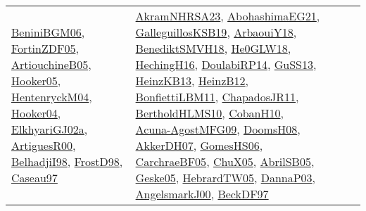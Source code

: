 {\begin{longtable}{lp{3cm}>{\raggedright}p{6cm}>{\raggedright}p{6cm}p{8cm}}
\href{papers/BeniniBGM06.pdf}{BeniniBGM06}\cite{BeniniBGM06}, \href{papers/FortinZDF05.pdf}{FortinZDF05}\cite{FortinZDF05}, \href{papers/ArtiouchineB05.pdf}{ArtiouchineB05}\cite{ArtiouchineB05}, \href{articles/Hooker05.pdf}{Hooker05}\cite{Hooker05}, \href{papers/HentenryckM04.pdf}{HentenryckM04}\cite{HentenryckM04}, \href{papers/Hooker04.pdf}{Hooker04}\cite{Hooker04}, \href{papers/ElkhyariGJ02a.pdf}{ElkhyariGJ02a}\cite{ElkhyariGJ02a}, \href{articles/ArtiguesR00.pdf}{ArtiguesR00}\cite{ArtiguesR00}, \href{articles/BelhadjiI98.pdf}{BelhadjiI98}\cite{BelhadjiI98}, \href{papers/FrostD98.pdf}{FrostD98}\cite{FrostD98}, \href{papers/Caseau97.pdf}{Caseau97}\cite{Caseau97} & \href{articles/AkramNHRSA23.pdf}{AkramNHRSA23}\cite{AkramNHRSA23}, \href{articles/AbohashimaEG21.pdf}{AbohashimaEG21}\cite{AbohashimaEG21}, \href{papers/GalleguillosKSB19.pdf}{GalleguillosKSB19}\cite{GalleguillosKSB19}, \href{papers/ArbaouiY18.pdf}{ArbaouiY18}\cite{ArbaouiY18}, \href{papers/BenediktSMVH18.pdf}{BenediktSMVH18}\cite{BenediktSMVH18}, \href{papers/He0GLW18.pdf}{He0GLW18}\cite{He0GLW18}, \href{papers/HechingH16.pdf}{HechingH16}\cite{HechingH16}, \href{papers/DoulabiRP14.pdf}{DoulabiRP14}\cite{DoulabiRP14}, \href{papers/GuSS13.pdf}{GuSS13}\cite{GuSS13}, \href{papers/HeinzKB13.pdf}{HeinzKB13}\cite{HeinzKB13}, \href{papers/HeinzB12.pdf}{HeinzB12}\cite{HeinzB12}, \href{papers/BonfiettiLBM11.pdf}{BonfiettiLBM11}\cite{BonfiettiLBM11}, \href{papers/ChapadosJR11.pdf}{ChapadosJR11}\cite{ChapadosJR11}, \href{papers/BertholdHLMS10.pdf}{BertholdHLMS10}\cite{BertholdHLMS10}, \href{papers/CobanH10.pdf}{CobanH10}\cite{CobanH10}, \href{papers/Acuna-AgostMFG09.pdf}{Acuna-AgostMFG09}\cite{Acuna-AgostMFG09}, \href{papers/DoomsH08.pdf}{DoomsH08}\cite{DoomsH08}, \href{papers/AkkerDH07.pdf}{AkkerDH07}\cite{AkkerDH07}, \href{papers/GomesHS06.pdf}{GomesHS06}\cite{GomesHS06}, \href{papers/CarchraeBF05.pdf}{CarchraeBF05}\cite{CarchraeBF05}, \href{papers/ChuX05.pdf}{ChuX05}\cite{ChuX05}, \href{papers/AbrilSB05.pdf}{AbrilSB05}\cite{AbrilSB05}, \href{papers/Geske05.pdf}{Geske05}\cite{Geske05}, \href{papers/HebrardTW05.pdf}{HebrardTW05}\cite{HebrardTW05}, \href{papers/DannaP03.pdf}{DannaP03}\cite{DannaP03}, \href{papers/AngelsmarkJ00.pdf}{AngelsmarkJ00}\cite{AngelsmarkJ00}, \href{papers/BeckDF97.pdf}{BeckDF97}\cite{BeckDF97}\\

\end{longtable}}
